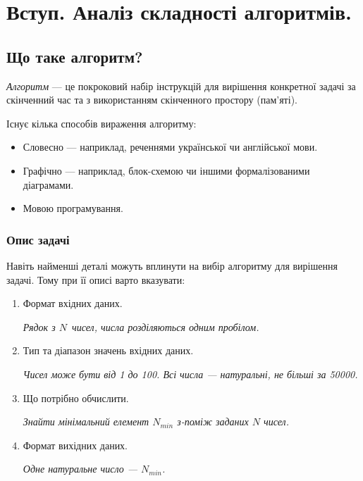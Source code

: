 \documentclass[12pt,a4paper]{report}
\begin{document}
\chapter{Вступ. Аналіз складності алгоритмів.}



\section{Що таке алгоритм?}
\emph{Алгоритм} --- це покроковий набір інструкцій для вирішення конкретної задачі за скінченний час та з використанням скінченного простору (пам’яті).

\vspace{0.5em}
Існує кілька способів вираження алгоритму:
\begin{itemize}
    \item Словесно --- наприклад, реченнями української чи англійської мови.
    \item Графічно --- наприклад, блок-схемою чи іншими формалізованими діаграмами.
    \item Мовою програмування.
\end{itemize}


\subsection*{Опис задачі}
Навіть найменші деталі можуть вплинути на вибір алгоритму для вирішення задачі.
Тому при її описі варто вказувати:
\begin{enumerate}
    \item Формат вхідних даних.

        {\itshape Рядок з \(N\)\ чисел, числа розділяються одним пробілом.}

    \item Тип та діапазон значень вхідних даних.

        {\itshape Чисел може бути від 1 до 100. Всі числа --- натуральні, не більші за 50000.}

    \item Що потрібно обчислити.

        {\itshape Знайти мінімальний елемент \(N_{min}\) з-поміж заданих \(N\) чисел.}

    \item Формат вихідних даних.

        {\itshape Одне натуральне число --- \(N_{min}\).}

\end{enumerate}
\end{document}
